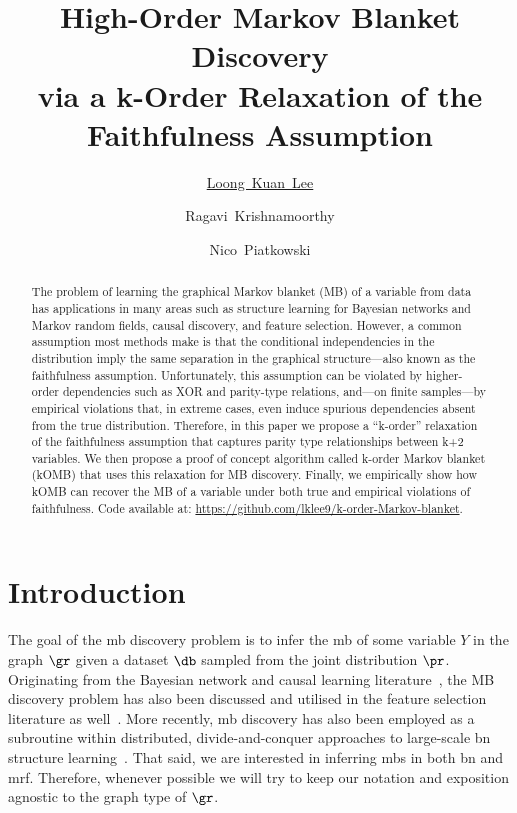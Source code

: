 \documentclass[accepted]{uai2026} %
\title{High-Order Markov Blanket Discovery\\
  via a k-Order Relaxation of the Faithfulness Assumption}
\author[1]{\href{mailto:<loong.kuan.lee@iais.fraunhofer.de>?Subject=Your UAI 2026 paper}{Loong~Kuan~Lee}{}}
\author[1]{Ragavi~Krishnamoorthy}
\author[1]{Nico~Piatkowski}
\affil[1]{%
  Hybrid Intelligence\\
  Fraunhofer IAIS\\
  Sankt Augustin, Germany\\
}
\theoremstyle{plain}
\theoremstyle{definition}
\theoremstyle{remark}
\begin{document}
\maketitle

\begin{abstract}
  The problem of learning the graphical Markov blanket (MB) of a
  variable from data has applications in many areas such as structure
  learning for Bayesian networks and Markov random fields, causal
  discovery, and feature selection. However, a common assumption most
  methods make is that the conditional independencies in the
  distribution imply the same separation in the graphical
  structure---also known as the faithfulness assumption. Unfortunately,
  this assumption can be violated by higher-order dependencies such as
  XOR and parity-type relations, and---on finite samples---by empirical
  violations that, in extreme cases, even induce spurious dependencies
  absent from the true distribution. Therefore, in this
  paper we propose a ``k-order'' relaxation of the faithfulness
  assumption that captures parity type relationships between k+2
  variables. We then propose a proof of concept algorithm called k-order
  Markov blanket (kOMB) that uses this relaxation for MB
  discovery. Finally, we empirically show how kOMB can recover the MB of
  a variable under both true and empirical violations of faithfulness.
  Code available at:
  \url{https://github.com/lklee9/k-order-Markov-blanket}.
\end{abstract}

\section{Introduction}\label{sec:intro}
The goal of the \acrfull{mb} discovery problem is to infer the \gls{mb}
of some variable $Y$ in the graph $\gr$ given a dataset $\db$ sampled
from the joint distribution $\pr$.  Originating from the Bayesian
network and causal learning
literature~\citep{margaritis1999,tsamardinos2003,ling2021,hu2024}, the
MB discovery problem has also been discussed and utilised in the feature
selection literature as well~\citep{tsamardinos2003a,wang2020}. More
recently, \gls{mb} discovery has also been employed as a subroutine
within distributed, divide-and-conquer approaches to large-scale
\gls{bn} structure learning~\citep{dong2025a}. That said, we are
interested in inferring \glspl{mb} in both \acrfull{bn} and
\acrfull{mrf}. Therefore, whenever possible we will try to keep our
notation and exposition agnostic to the graph type of $\gr$.
\end{document}
